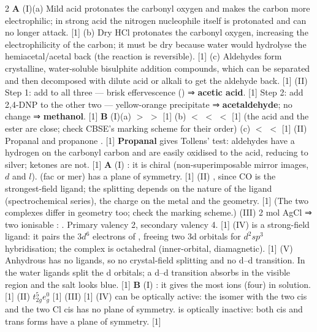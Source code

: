 \documentclass[10pt,a4paper]{extarticle}
\newcommand{\mk}[1]{{\scriptsize\color{black!55}[#1]}}
\begin{document}
\begin{multicols}{2}
\An \textbf{A} (I)(a) Mild acid protonates the carbonyl oxygen and makes the carbon more electrophilic; in strong acid the nitrogen nucleophile itself is protonated and can no longer attack. \mk{1}\nl
(b) Dry HCl protonates the carbonyl oxygen, increasing the electrophilicity of the carbon; it must be dry because water would hydrolyse the hemiacetal/acetal back (the reaction is reversible). \mk{1}\nl
(c) Aldehydes form crystalline, water-soluble bisulphite addition compounds, which can be separated and then decomposed with dilute acid or alkali to get the aldehyde back. \mk{1}\nl
(II) Step 1: add  to all three — brisk effervescence () ⇒ \textbf{acetic acid}. \mk{1} Step 2: add 2,4-DNP to the other two — yellow-orange precipitate ⇒ \textbf{acetaldehyde}; no change ⇒ \textbf{methanol}. \mk{1}\nl
\textbf{B} (I)(a)  $>$  $>$  \mk{1}\nl
(b)  $<$  $<$  $<$  \mk{1} {\scriptsize(the acid and the ester are close; check CBSE's marking scheme for their order)}\nl
(c)  $<$  $<$  \mk{1}\nl
(II) Propanal  and propanone . \mk{1} \textbf{Propanal} gives Tollens' test: aldehydes have a hydrogen on the carbonyl carbon and are easily oxidised to the acid, reducing  to silver; ketones are not. \mk{1}
\An \textbf{A} (I) : it is chiral (non-superimposable mirror images, $d$ and $l$). \ce{[Cr(H2O)3Cl3]} (fac or mer) has a plane of symmetry. \mk{1}\nl
(II) \ce{[Ni(CO)4]}, since CO is the strongest-field ligand; the splitting depends on the nature of the ligand (spectrochemical series), the charge on the metal and the geometry. \mk{1} {\scriptsize(The two complexes differ in geometry too; check the marking scheme.)}\nl
(III) 2 mol AgCl ⇒ two ionisable : . Primary valency 2, secondary valency 4. \mk{1}\nl
(IV)  is a strong-field ligand: it pairs the $3d^6$ electrons of , freeing two 3d orbitals for $d^2sp^3$ hybridisation; the complex is octahedral (inner-orbital, diamagnetic). \mk{1}\nl
(V) Anhydrous  has no ligands, so no crystal-field splitting and no d--d transition. In  the water ligands split the d orbitals; a d--d transition absorbs in the visible region and the salt looks blue. \mk{1}\nl
\textbf{B} (I) : it gives the most ions (four) in solution. \mk{1}\nl
(II) $t_{2g}^5e_g^0$ \mk{1}\nl
(III)  \mk{1}\nl
(IV)  can be optically active: the isomer with the two  cis and the two Cl cis has no plane of symmetry.  is optically inactive: both cis and trans forms have a plane of symmetry. \mk{1}\nl

\end{multicols}
\end{document}
